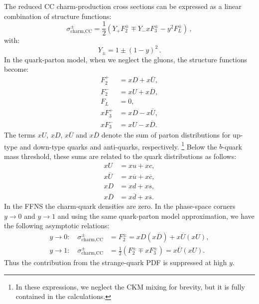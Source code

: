 \documentclass[pdftex,twocolumn,epjc3]{svjour3}          %
\begin{document}
The reduced CC charm-production cross sections can be expressed as a
linear combination of structure functions:
\begin{equation}
  \sigma^{\pm}_{\text{charm,CC}} = \frac12\left(Y_{+}F_2^{\pm} \mp
    Y_{-}xF_3^{\pm} - y^2F_L^{\pm}\right)\,,
\end{equation}
with:
\begin{equation}
  Y_{\pm} = 1 \pm (1-y)^2 \,.
\end{equation}
In the quark-parton model,
when we neglect the gluons, the structure
functions become:
\begin{equation}
\begin{split}
    F_2^{+} &= xD + x\overline{U}, \\
    F_2^{-} &= xU + x\overline{D},\\
    F_L &= 0,\\
    xF_3^{+} &= xD - x\overline{U}, \\
    xF_3^{-} &= xU - x\overline{D}.
\end{split}
\end{equation}
The terms $xU$, $xD$, $x\overline{U}$ and $x\overline{D}$ denote the
sum of parton distributions for up-type and down-type quarks and
anti-quarks, respectively.%
\footnote{In these expressions, we neglect the CKM mixing for brevity, but it is fully contained in the calculations.} 
Below the $b$-quark mass threshold, these
sums are related to the quark distributions as follows:
\begin{equation}
\begin{split}
 xU &= xu + xc , \\
 x\overline{U} &= x\overline{u} + x\overline{c} , \\
 xD &= xd + xs , \\
 x\overline{D} &= x\overline{d} + x\overline{s}.
\end{split}
\end{equation}
In the FFNS the charm-quark densities are zero. In the phase-space
corners $y \to 0$ and $y \to 1$ and using the same quark-parton model approximation, we have the following asymptotic
relations:
\begin{equation}
\begin{split}
 y \to 0: \quad \sigma^{\pm}_{\text{charm,CC}} &= F_2^{\pm} = xD(x\overline{D}) + x\overline{U}(xU), \\[10pt]
 y \to 1: \quad \sigma^{\pm}_{\text{charm,CC}} &= \frac12(F_2^{\pm} \mp xF_3^{\pm}) = x\overline{U} (xU).
\label{eq:y01}
\end{split}
\end{equation}
Thus the contribution from the strange-quark PDF is suppressed at high $y$.
\end{document}
